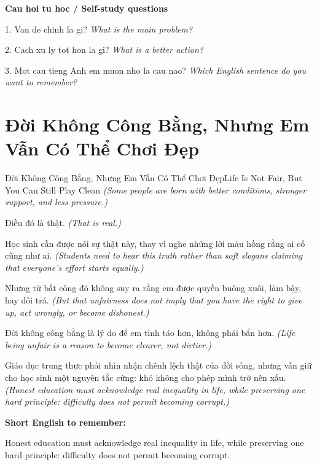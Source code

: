 \begin{tuhocnhanh}
\textbf{Cau hoi tu hoc / Self-study questions}

1. Van de chinh la gi? \textit{What is the main problem?}

2. Cach xu ly tot hon la gi? \textit{What is a better action?}

3. Mot cau tieng Anh em muon nho la cau nao? \textit{Which English sentence do you want to remember?}
\end{tuhocnhanh}
\ngancach

\section{Đời Không Công Bằng, Nhưng Em Vẫn Có Thể Chơi Đẹp}
\begin{truyen}{Đời Không Công Bằng, Nhưng Em Vẫn Có Thể Chơi Đẹp}{Life Is Not Fair, But You Can Still Play Clean}
\textit{(Some people are born with better conditions, stronger support, and less pressure.)}

Điều đó là thật.
\textit{(That is real.)}

Học sinh cần được nói sự thật này, thay vì nghe những lời màu hồng rằng ai cố cũng như ai.
\textit{(Students need to hear this truth rather than soft slogans claiming that everyone’s effort starts equally.)}

Nhưng từ bất công đó không suy ra rằng em được quyền buông xuôi, làm bậy, hay dối trá.
\textit{(But that unfairness does not imply that you have the right to give up, act wrongly, or become dishonest.)}

Đời không công bằng là lý do để em tỉnh táo hơn, không phải bẩn hơn.
\textit{(Life being unfair is a reason to become clearer, not dirtier.)}

\end{truyen}

\begin{baihoc}
Giáo dục trung thực phải nhìn nhận chênh lệch thật của đời sống, nhưng vẫn giữ cho học sinh một nguyên tắc cứng: khó không cho phép mình trở nên xấu.
\textit{(Honest education must acknowledge real inequality in life, while preserving one hard principle: difficulty does not permit becoming corrupt.)}
\end{baihoc}

\begin{ghinhoanh}
\textbf{Short English to remember:}

Honest education must acknowledge real inequality in life, while preserving one hard principle: difficulty does not permit becoming corrupt.

\end{ghinhoanh}

